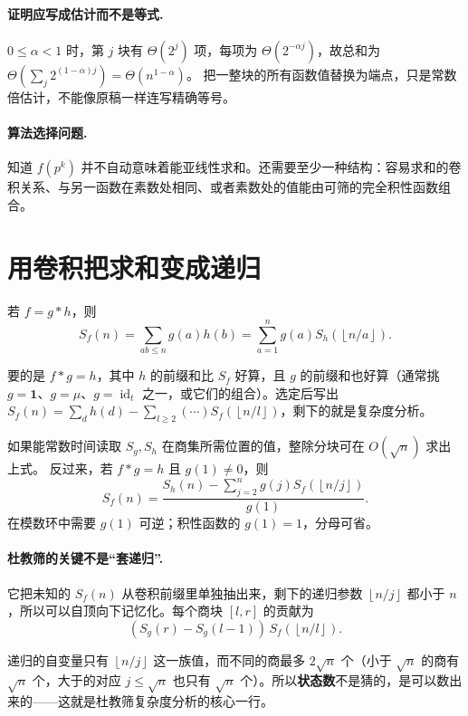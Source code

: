 \documentclass[UTF8,a4paper,11pt,twoside,openright,fontset=fandol]{ctexbook}
\theoremstyle{definition}
\newcommand{\one}{\mathbf 1}
\newcommand{\id}{\operatorname{id}}
\newcommand{\floor}[1]{\left\lfloor #1\right\rfloor}
\begin{document}
\paragraph{证明应写成估计而不是等式.}
$0\le\alpha<1$ 时，第 $j$ 块有 $\Theta(2^j)$ 项，每项为 $\Theta(2^{-\alpha j})$，故总和为 $\Theta(\sum_j2^{(1-\alpha)j})=\Theta(n^{1-\alpha})$。
把一整块的所有函数值替换为端点，只是常数倍估计，不能像原稿一样连写精确等号。
\paragraph{算法选择问题.} 知道 $f(p^k)$ 并不自动意味着能亚线性求和。还需要至少一种结构：容易求和的卷积关系、与另一函数在素数处相同、或者素数处的值能由可筛的完全积性函数组合。


\section{用卷积把求和变成递归}
若 $f=g*h$，则
\[
S_f(n)=\sum_{ab\le n}g(a)h(b)
=\sum_{a=1}^n g(a)S_h(\floor{n/a}).
\]

\begin{tip}[选 $g$ 的原则]
要的是 $f*g=h$，其中 $h$ 的前缀和比 $S_f$ 好算，且 $g$ 的前缀和也好算（通常挑 $g=\one$、$g=\mu$、$g=\id_t$ 之一，或它们的组合）。选定后写出 $S_f(n)=\sum_{d}h(d)-\sum_{l\ge2}(\cdots)S_f(\floor{n/l})$，剩下的就是复杂度分析。
\end{tip}

如果能常数时间读取 $S_g,S_h$ 在商集所需位置的值，整除分块可在 $O(\sqrt n)$ 求出上式。
反过来，若 $f*g=h$ 且 $g(1)\ne0$，则
\[
\boxed{S_f(n)=\frac{S_h(n)-\sum_{j=2}^n g(j)S_f(\floor{n/j})}{g(1)}}.
\]
在模数环中需要 $g(1)$ 可逆；积性函数的 $g(1)=1$，分母可省。


\paragraph{杜教筛的关键不是“套递归”.}
它把未知的 $S_f(n)$ 从卷积前缀里单独抽出来，剩下的递归参数 $\floor{n/j}$ 都小于 $n$，所以可以自顶向下记忆化。每个商块 $[l,r]$ 的贡献为
\[
 (S_g(r)-S_g(l-1))\,S_f(\floor{n/l}).
\]

\begin{tip}[记忆化为什么够用]
递归的自变量只有 $\floor{n/j}$ 这一族值，而不同的商最多 $2\sqrt n$ 个（小于 $\sqrt n$ 的商有 $\sqrt n$ 个，大于的对应 $j\le\sqrt n$ 也只有 $\sqrt n$ 个）。所以\textbf{状态数}不是猜的，是可以数出来的——这就是杜教筛复杂度分析的核心一行。
\end{tip}
\end{document}
